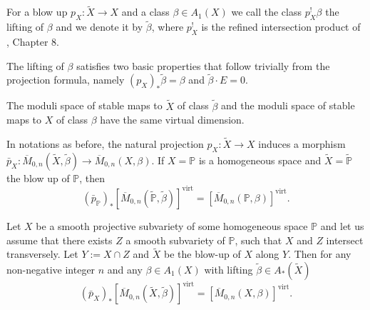 \begin{definition}\label{manolacheVirtualPullbacks2012-def-5.10}
 \label{manolacheVirtualPullbacks2012-lifting}
For a blow up $p_X:\tilde{X}\to X$ and a class $\beta\in A_1(X)$ we call the class $p_X^!\beta$ the lifting of $\beta$ and we denote it by $\tilde{\beta}$, where $p_X^!$ is the refined intersection product of \cite{f}, Chapter 8.
\end{definition}

\begin{remark}\label{manolacheVirtualPullbacks2012-rem-5.11}
 The lifting of $\beta$ satisfies two basic properties that follow trivially from the projection formula, namely $(p_X)_*\tilde{\beta}=\beta$ and $\tilde{\beta}\cdot E=0$.
\end{remark}

\begin{lemma}\label{manolacheVirtualPullbacks2012-lem-5.12}
The moduli space of stable maps to $\tilde{X}$ of class $\tilde{\beta}$ and the moduli space of stable maps to $X$ of class $\beta$ have the same virtual dimension.
\end{lemma}

\begin{lemma}\label{manolacheVirtualPullbacks2012-lem-5.13}
\label{manolacheVirtualPullbacks2012-andreas}
 In notations as before, the natural projection $p_{X}:\tilde{X}\to X$ induces a morphism $\bar{p}_{X}:\overline{M}_{0,n}(\tilde{X},\tilde{\beta})\to\overline{M}_{0,n}(X,\beta)$. If $X=\mathbb{P}$ is a homogeneous space and $\tilde{X}=\tilde{\mathbb{P}}$ the blow up of $\mathbb{P}$, then $$({\bar{p}}_{\mathbb{P}})_*[\overline{M}_{0,n}(\tilde{\mathbb{P}},\tilde{\beta})]^{\mathrm{virt}}=[\overline{M}_{0,n}(\mathbb{P},\beta)]^{\mathrm{virt}}.$$
\end{lemma}

\begin{proposition}\label{manolacheVirtualPullbacks2012-prop-5.14}
\label{manolacheVirtualPullbacks2012-main} Let $X$ be a smooth projective subvariety of some homogeneous space $\mathbb{P}$ and let us assume that there exists $Z$ a smooth subvariety of $\mathbb{P}$, such that $X$ and $Z$ intersect transversely. Let $Y:=X\cap Z$ and $\tilde{X}$ be the blow-up of $X$ along $Y$. Then for any non-negative integer $n$ and any $\beta\in A_1(X)$ with lifting $\tilde{\beta}\in A_*(\tilde{X})$ $$(\bar{p}_{X})_*[\overline{M}_{0,n}(\tilde{X},\tilde{\beta})]^{\mathrm{virt}}=[\overline{M}_{0,n}(X,\beta)]^{\mathrm{virt}}.$$
\end{proposition}

